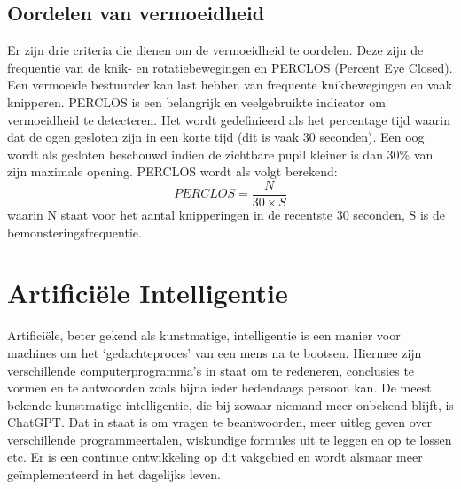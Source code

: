 \subsection{Oordelen van vermoeidheid}
Er zijn drie criteria die dienen om de vermoeidheid te oordelen. Deze zijn de frequentie van de knik- en rotatiebewegingen en PERCLOS (Percent Eye Closed). Een vermoeide bestuurder kan last hebben van frequente knikbewegingen en vaak knipperen. PERCLOS is een belangrijk en veelgebruikte indicator om vermoeidheid te detecteren. Het wordt gedefinieerd als het percentage tijd waarin dat de ogen gesloten zijn in een korte tijd (dit is vaak 30 seconden). Een oog wordt als gesloten beschouwd indien de zichtbare pupil kleiner is dan 30\% van zijn maximale opening. PERCLOS wordt als volgt berekend: \begin{equation*}PERCLOS = \frac{N}{30\times S}\end{equation*} waarin N staat voor het aantal knipperingen in de recentste 30 seconden, S is de bemonsteringsfrequentie.


\section{Artificiële Intelligentie}
Artificiële, beter gekend als kunstmatige, intelligentie is een manier voor machines om het `gedachteproces' van een mens na te bootsen. Hiermee zijn verschillende computerprogramma's in staat om te redeneren, conclusies te vormen en te antwoorden zoals bijna ieder hedendaags persoon kan. De meest bekende kunstmatige intelligentie, die bij zowaar niemand meer onbekend blijft, is ChatGPT. Dat in staat is om vragen te beantwoorden, meer uitleg geven over verschillende programmeertalen, wiskundige formules uit te leggen en op te lossen etc. Er is een continue ontwikkeling op dit vakgebied en wordt alsmaar meer geïmplementeerd in het dagelijks leven.

